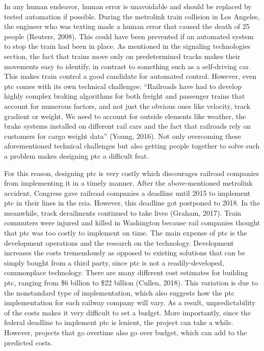 \documentclass[11pt, titlepage]{article}
\begin{document}
In any human endeavor, human error is unavoidable and should be replaced by tested
automation if possible. During the \gls{metrolink} train collision in Los Angeles,
the engineer who was texting made a human error that caused the death of 25
people (Reuters, 2008). This could have been prevented if an automated system to
stop the train had been in place. As mentioned in the signaling technologies
section, the fact that trains move only on predetermined tracks makes their
movements easy to identify, in contrast to something such as a self-driving car.
This makes train control a good candidate for automated control. However, even
\gls{ptc} comes with its own technical challenges: ``Railroads have had to develop
highly complex braking algorithms for both freight and passenger trains that
account for numerous factors, and not just the obvious ones like velocity, track
gradient or weight. We need to account for outside elements like weather, the
brake systems installed on different rail cars and the fact that railroads rely on
customers for cargo weight data'' (Young, 2016). Not only overcoming these
aforementioned technical challenges but also getting people together to solve such
a problem makes designing \gls{ptc} a difficult feat.

For this reason, designing \gls{ptc} is very costly which discourages railroad
companies from implementing it in a timely manner. After the above-mentioned
\gls{metrolink} accident, Congress gave railroad companies a deadline until 2015 to
implement \gls{ptc} in their lines in the \gls{rsia}. However, this deadline got
postponed to 2018. In the meanwhile, track derailments continued to take lives
(Graham, 2017). Train commuters were injured and killed in Washington because rail
companies thought that \gls{ptc} was too costly to implement on time. The main
expense of \gls{ptc} is the development operations and the research on the
technology. Development increases the costs tremendously as opposed to existing
solutions that can be simply bought from a third party, since \gls{ptc} is not a
readily-developed, commonplace technology. There are many different cost estimates
for building \gls{ptc}, ranging from \$6 billion to \$22 billion (Cullen, 2018).
This variation is due to the nonstandard type of implementation, which also suggests
how the \gls{ptc} implementation for each railway company will vary. As a result,
unpredictability of the costs makes it very difficult to set a budget. More
importantly, since the federal deadline to implement \gls{ptc} is lenient, the
project can take a while. However, projects that go overtime also go over budget,
which can add to the predicted costs.
\end{document}
